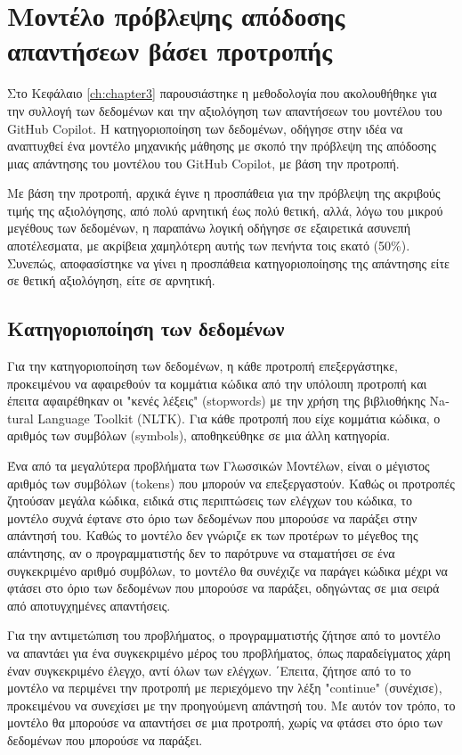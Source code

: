 \chapter{Μοντέλο πρόβλεψης απόδοσης απαντήσεων βάσει προτροπής}
\label{ch:chapter4}

Στο Κεφάλαιο \ref{ch:chapter3} παρουσιάστηκε η μεθοδολογία που
ακολουθήθηκε για την συλλογή των δεδομένων και την αξιολόγηση των
απαντήσεων του μοντέλου του \textlatin{GitHub Copilot}. Η
κατηγοριοποίηση των δεδομένων, οδήγησε στην ιδέα να αναπτυχθεί ένα
μοντέλο μηχανικής μάθησης με σκοπό την πρόβλεψη της απόδοσης μιας
απάντησης του μοντέλου του \textlatin{GitHub Copilot}, με βάση την
προτροπή.

Με βάση την προτροπή, αρχικά έγινε η προσπάθεια για την πρόβλεψη της
ακριβούς τιμής της αξιολόγησης, από πολύ αρνητική έως πολύ θετική, αλλά,
λόγω του μικρού μεγέθους των δεδομένων, η παραπάνω λογική οδήγησε σε
εξαιρετικά ασυνεπή αποτέλεσματα, με ακρίβεια χαμηλότερη αυτής των
πενήντα τοις εκατό (50\%). Συνεπώς, αποφασίστηκε να γίνει η προσπάθεια
κατηγοριοποίησης της απάντησης είτε σε θετική αξιολόγηση, είτε σε
αρνητική.

\section{Κατηγοριοποίηση των δεδομένων}

Για την κατηγοριοποίηση των δεδομένων, η κάθε προτροπή επεξεργάστηκε,
προκειμένου να αφαιρεθούν τα κομμάτια κώδικα από την υπόλοιπη προτροπή
και έπειτα αφαιρέθηκαν οι "κενές λέξεις" (\textlatin{stopwords}) με την
χρήση της βιβλιοθήκης \textlatin{Natural Language Toolkit (NLTK)}. Για
κάθε προτροπή που είχε κομμάτια κώδικα, ο αριθμός των συμβόλων
(\textlatin{symbols}), αποθηκεύθηκε σε μια άλλη κατηγορία.

Ένα από τα μεγαλύτερα προβλήματα των Γλωσσικών Μοντέλων, είναι ο
μέγιστος αριθμός των συμβόλων (\textlatin{tokens}) που μπορούν να
επεξεργαστούν. Καθώς οι προτροπές ζητούσαν μεγάλα κώδικα, ειδικά στις
περιπτώσεις των ελέγχων του κώδικα, το μοντέλο συχνά έφτανε στο όριο των
δεδομένων που μπορούσε να παράξει στην απάντησή του. Καθώς το μοντέλο
δεν γνώριζε εκ των προτέρων το μέγεθος της απάντησης, αν ο
προγραμματιστής δεν το παρότρυνε να σταματήσει σε ένα συγκεκριμένο
αριθμό συμβόλων, το μοντέλο θα συνέχιζε να παράγει κώδικα μέχρι να
φτάσει στο όριο των δεδομένων που μπορούσε να παράξει, οδηγώντας σε μια
σειρά από αποτυγχημένες απαντήσεις.

Για την αντιμετώπιση του προβλήματος, ο προγραμματιστής ζήτησε από το
μοντέλο να απαντάει για ένα συγκεκριμένο μέρος του προβλήματος, όπως
παραδείγματος χάρη έναν συγκεκριμένο έλεγχο, αντί όλων των ελέγχων.
΄Επειτα, ζήτησε από το το μοντέλο να περιμένει την προτροπή με
περιεχόμενο την λέξη "\textlatin{continue}" (συνέχισε), προκειμένου να
συνεχίσει με την προηγούμενη απάντησή του. Με αυτόν τον τρόπο, το
μοντέλο θα μπορούσε να απαντήσει σε μια προτροπή, χωρίς να φτάσει στο
όριο των δεδομένων που μπορούσε να παράξει.

